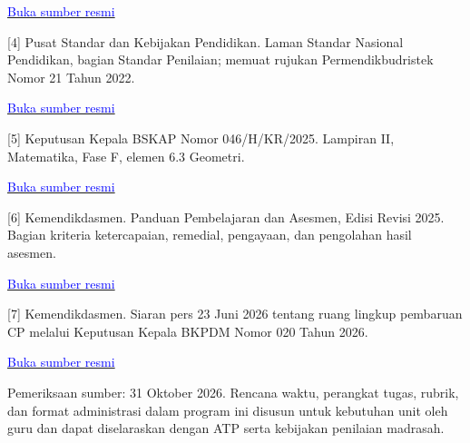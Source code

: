 \documentclass[11pt,a4paper]{article}
\begin{document}
\href{https://jdih.kemendikdasmen.go.id/sjdih/siperpu/dokumen/abstraksi/Abstrak%20RPM%20Standar%20Proses.pdf}{\small\textcolor{blue}{Buka sumber resmi}}\par
\vspace{8.50393701pt}
[4] Pusat Standar dan Kebijakan Pendidikan. Laman Standar Nasional Pendidikan, bagian Standar Penilaian; memuat rujukan Permendikbudristek Nomor 21 Tahun 2022.\par\medskip
\href{https://pskp.kemendikdasmen.go.id/standar-nasional-pendidikan-a/standar-proses}{\small\textcolor{blue}{Buka sumber resmi}}\par
\vspace{8.50393701pt}
[5] Keputusan Kepala BSKAP Nomor 046/H/KR/2025. Lampiran II, Matematika, Fase F, elemen 6.3 Geometri.\par\medskip
\href{https://bpmpbabel.kemendikdasmen.go.id/PPID/wp-content/uploads/2025/07/KepKaBSKAP-046_2025-ttg-CP.pdf}{\small\textcolor{blue}{Buka sumber resmi}}\par
\vspace{8.50393701pt}
[6] Kemendikdasmen. Panduan Pembelajaran dan Asesmen, Edisi Revisi 2025. Bagian kriteria ketercapaian, remedial, pengayaan, dan pengolahan hasil asesmen.\par\medskip
\href{https://kurikulum.kemendikdasmen.go.id/file/1755668120_manage_file.pdf}{\small\textcolor{blue}{Buka sumber resmi}}\par
\vspace{8.50393701pt}
[7] Kemendikdasmen. Siaran pers 23 Juni 2026 tentang ruang lingkup pembaruan CP melalui Keputusan Kepala BKPDM Nomor 020 Tahun 2026.\par\medskip
\href{https://www.kemendikdasmen.go.id/siaran-pers/15636-capaian-pembelajaran-baru-telah-terbit-yang-berubah-hanya-mata-pelajaran-agama-dan-budi-pekerti}{\small\textcolor{blue}{Buka sumber resmi}}\par
\vspace{8.50393701pt}
{\small Pemeriksaan sumber: 31 Oktober 2026. Rencana waktu, perangkat tugas, rubrik, dan format administrasi dalam program ini disusun untuk kebutuhan unit oleh guru dan dapat diselaraskan dengan ATP serta kebijakan penilaian madrasah.\par}\medskip
\end{document}
